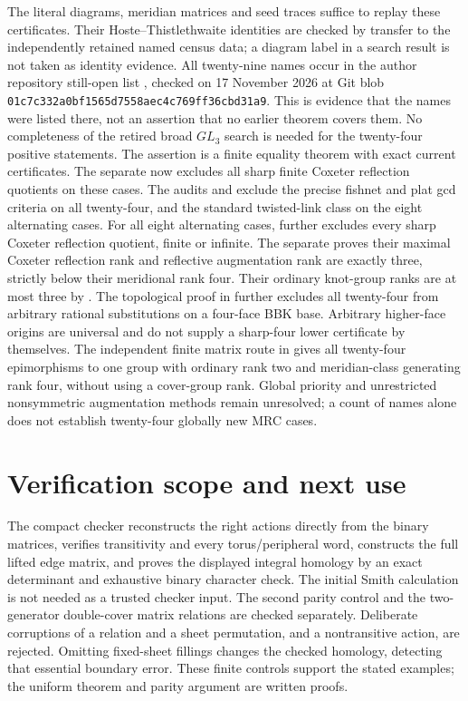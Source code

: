 \documentclass[11pt]{article}
\begin{document}
The literal diagrams, meridian matrices and seed traces suffice to
replay these certificates. Their Hoste--Thistlethwaite identities are
checked by transfer to the independently retained named census data;
a diagram label in a search result is not taken as identity evidence.
All twenty-nine names occur in the author repository still-open list
\cite{bhattacharjee}, checked on 17 November 2026 at Git blob
\texttt{01c7c332a0bf1565d7558aec4c769ff36cbd31a9}. This is evidence
that the names were listed there, not an assertion that no earlier
theorem covers them. No completeness of the retired broad
$GL_3$ search is needed for the twenty-four positive statements.
The assertion is a finite equality theorem with exact current
certificates. The separate  now
excludes all sharp finite Coxeter reflection quotients on these cases.
The audits  and
 exclude the precise
fishnet and plat gcd criteria on all twenty-four, and the standard
twisted-link class on the eight alternating cases.
For all eight alternating cases,
 further excludes every
sharp Coxeter reflection quotient, finite or infinite. The separate
 proves their maximal
Coxeter reflection rank and reflective augmentation rank are exactly
three, strictly below their meridional rank four.
Their ordinary knot-group ranks are at most three by
. The topological proof in
 further excludes all
twenty-four from arbitrary rational substitutions on a four-face BBK
base. Arbitrary higher-face origins are universal and do not supply
a sharp-four lower certificate by themselves. The independent finite
matrix route in  gives all
twenty-four epimorphisms to one group with ordinary rank two and
meridian-class generating rank four, without using a cover-group rank.
Global priority and unrestricted nonsymmetric augmentation methods
remain unresolved;
a count of names alone does not establish twenty-four globally new
MRC cases.

\section{Verification scope and next use}

The compact checker reconstructs the right actions directly from the
binary matrices, verifies transitivity and every torus/peripheral word,
constructs the full lifted edge matrix, and proves the displayed integral
homology by an exact determinant and exhaustive binary character check.
The initial Smith calculation is not needed as a trusted checker input.
The second parity control and the two-generator double-cover matrix
relations are checked separately. Deliberate corruptions of a relation and a sheet permutation, and a
nontransitive action, are rejected. Omitting fixed-sheet fillings changes
the checked homology, detecting that essential boundary error.
These finite controls support the stated examples; the uniform theorem
and parity argument are written proofs.
\end{document}

